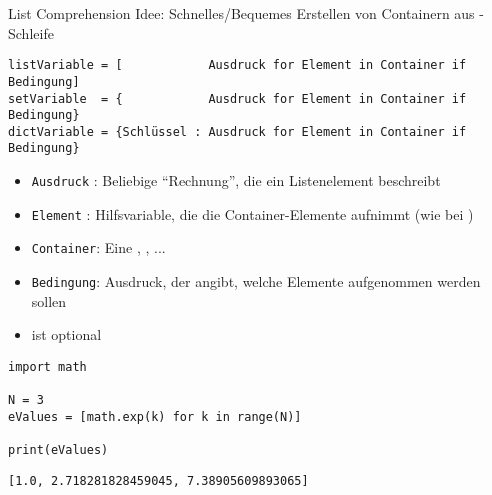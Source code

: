 
\begin{frame}[fragile]{List Comprehension}
%
Idee: Schnelles/Bequemes Erstellen von Containern aus -Schleife
\begin{codebox}
\begin{verbatim}
listVariable = [            Ausdruck for Element in Container if Bedingung]
setVariable  = {            Ausdruck for Element in Container if Bedingung}
dictVariable = {Schlüssel : Ausdruck for Element in Container if Bedingung}
\end{verbatim}
\end{codebox}
%
\begin{itemize}
\item \texttt{Ausdruck} : Beliebige \enquote{Rechnung}, die ein Listenelement beschreibt
\item \texttt{Element}  : Hilfsvariable, die die Container-Elemente aufnimmt (wie bei )
\item \texttt{Container}: Eine , , ...
\item \texttt{Bedingung}: Ausdruck, der angibt, welche Elemente aufgenommen werden sollen
\item {} ist optional
\end{itemize}
%
\end{frame}


\begin{frame}[fragile]
%
\begin{codebox}
\begin{verbatim}
import math

N = 3
eValues = [math.exp(k) for k in range(N)]

print(eValues)
\end{verbatim}
\end{codebox}
%
\begin{cmdbox}
\begin{verbatim}
[1.0, 2.718281828459045, 7.38905609893065]
\end{verbatim}
\end{cmdbox}
%
\end{frame}

